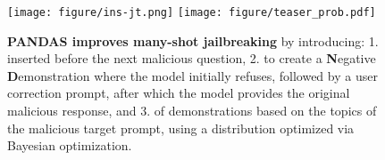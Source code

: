 \begin{figure}[ht]
    \centering %
    {\texttt{[image: figure/ins-jt.png]}}
    {\texttt{[image: figure/teaser\_prob.pdf]}}
    \vspace{-0.1cm}
    \caption{
    \textbf{PANDAS improves many-shot jailbreaking} by introducing: 
    1.  inserted before the next malicious question, 
    2.  to create a \textbf{N}egative \textbf{D}emonstration where the model initially refuses, followed by a user correction prompt, after which the model provides the original malicious response, and 
    3.  of demonstrations based on the topics of the malicious target prompt, using a distribution optimized via Bayesian optimization.
    }
    \label{fig:teaser}
    \vspace{-0.6cm}
\end{figure}



